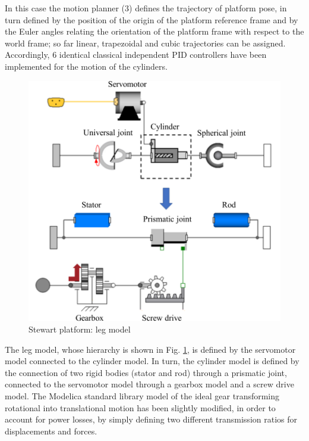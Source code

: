 \documentclass[]{interact}
\theoremstyle{plain}%
\theoremstyle{definition}
\theoremstyle{remark}
\begin{document}
In this case the motion planner (3) defines the trajectory of platform pose, in turn defined by the position of the origin of the platform reference frame and by the Euler angles relating the orientation of the platform frame with respect to the world frame; so far linear, trapezoidal and cubic trajectories can be assigned. Accordingly, 6 identical classical independent PID controllers have been implemented for the motion of the cylinders.

\begin{figure}
\centering
\includegraphics[width=0.65\columnwidth]{./images/Stewart_platform_Modelica_leg.pdf}
\caption{Stewart platform: leg model} \label{Fig:Stewart_platform_Modelica_leg}
\end{figure}
The leg model, whose hierarchy is shown in Fig. \ref{Fig:Stewart_platform_Modelica_leg}, is defined by the servomotor model connected to the cylinder model. In turn, the cylinder model is defined by the connection of two rigid bodies (stator and rod) through a prismatic joint, connected to the servomotor model through a gearbox model and a screw drive model. The Modelica standard library model of the ideal gear transforming rotational into translational motion has been slightly modified, in order to account for power losses, by simply defining two different transmission ratios for displacements and forces.
\end{document}

